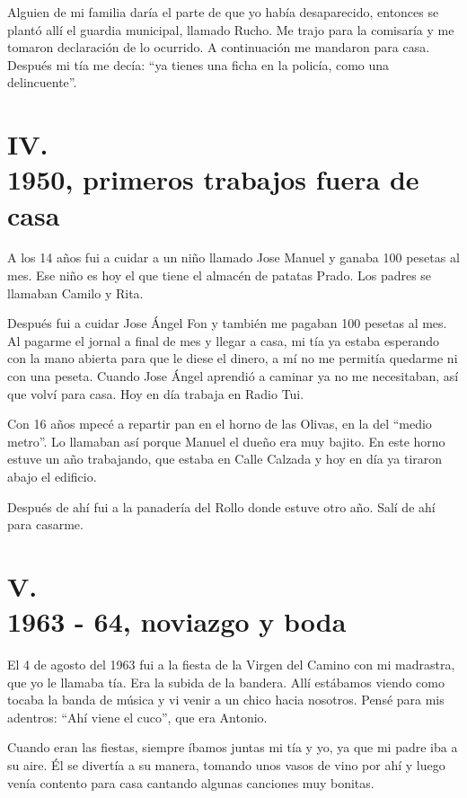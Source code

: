 \documentclass[12pt,a5paper]{book}
\begin{document}
Alguien de mi familia daría el parte de que yo había desaparecido, entonces se plantó allí el guardia municipal, llamado Rucho. Me trajo para la comisaría y me tomaron declaración de lo ocurrido. A continuación me mandaron para casa. Después mi tía me decía: ``ya tienes una ficha en la policía, como una delincuente''.



\section*{IV.\\1950, primeros trabajos fuera de casa}

A los 14 años fui a cuidar a un niño llamado Jose Manuel y ganaba 100 pesetas al mes. Ese niño es hoy el que tiene el almacén de patatas Prado. Los padres se llamaban Camilo y Rita. 

Después fui a cuidar Jose Ángel Fon y también me pagaban 100 pesetas al mes. Al pagarme el jornal a final de mes y llegar a casa, mi tía ya estaba esperando con la mano abierta para que le diese el dinero, a mí no me permitía quedarme ni con una peseta. Cuando Jose Ángel aprendió a caminar ya no me necesitaban, así que volví para casa. Hoy en día trabaja en Radio Tui.

Con 16 años mpecé a repartir pan en el horno de las Olivas, en la del ``medio metro''. Lo llamaban así porque Manuel el dueño era muy bajito. En este horno estuve un año trabajando, que estaba en Calle Calzada y hoy en día ya tiraron abajo el edificio.

Después de ahí fui a la panadería del Rollo donde estuve otro año. Salí de ahí para casarme.


\section*{V.\\1963 - 64, noviazgo y boda}


El 4 de agosto del 1963 fui a la fiesta de la Virgen del Camino con mi madrastra, que yo le llamaba tía. Era la subida de la bandera. Allí estábamos viendo como tocaba la banda de música y vi venir a un chico hacia nosotros. Pensé para mis adentros: ``Ahí viene el cuco'', que era Antonio.

Cuando eran las fiestas, siempre íbamos juntas mi tía y yo, ya que mi padre iba a su aire. Él se divertía a su manera, tomando unos vasos de vino por ahí y luego venía contento para casa cantando algunas canciones muy bonitas.
\end{document}
